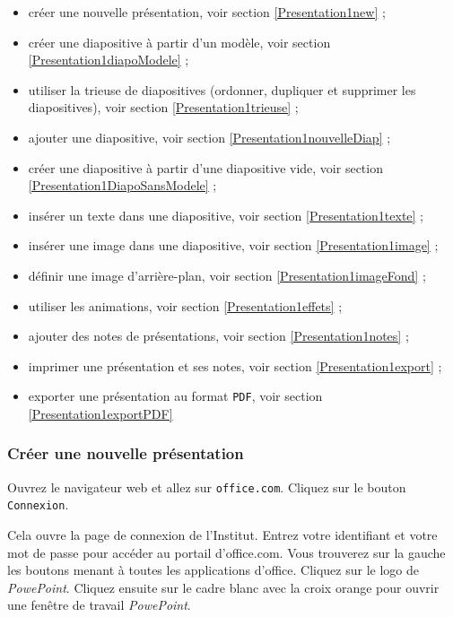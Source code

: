 \begin{itemize}   
\item créer une nouvelle présentation, voir section \vref{Presentation1new} ;
\item créer une diapositive à partir d'un modèle, voir section \vref{Presentation1diapoModele} ;
\item utiliser la trieuse de diapositives (ordonner, dupliquer et supprimer les diapositives), voir section \vref{Presentation1trieuse} ;
\item ajouter une diapositive, voir section \vref{Presentation1nouvelleDiap} ;
\item créer une diapositive à partir d'une diapositive vide, voir section \vref{Presentation1DiapoSansModele} ;
\item insérer un texte dans une diapositive, voir section \vref{Presentation1texte} ;
\item insérer une image dans une diapositive, voir section \vref{Presentation1image} ;
\item définir une image d'arrière-plan, voir section \vref{Presentation1imageFond} ;
\item utiliser les animations, voir section \vref{Presentation1effets} ;

\item ajouter des notes de présentations, voir section \vref{Presentation1notes} ;
\item imprimer une présentation et ses notes, voir section \vref{Presentation1export} ;
\item exporter une présentation au format \texttt{PDF}, voir section \vref{Presentation1exportPDF} 
\end{itemize}  





\subsubsection{Créer une nouvelle présentation}\label{Presentation1new}

Ouvrez le navigateur web et allez sur \texttt{office.com}. Cliquez sur le bouton \texttt{Connexion}.


Cela ouvre la page de connexion de l'Institut. Entrez votre identifiant et votre mot de passe pour accéder au portail d'office.com. Vous trouverez sur la gauche les boutons menant à toutes les applications d'office. Cliquez sur le logo de \emph{PowePoint}. Cliquez ensuite sur le cadre blanc avec la croix orange pour ouvrir une fenêtre de travail \emph{PowePoint}.

